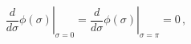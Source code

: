 \begin{equation}
\left. {\frac{d}{d\sigma }}\phi (\sigma )\right| _{\sigma =0}=\left. {\frac{d%
}{d\sigma }}\phi (\sigma )\right| _{\sigma =\pi }=0\,,
\end{equation}

